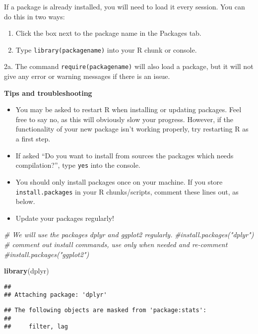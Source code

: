\documentclass[]{article}
\newenvironment{Shaded}{\begin{snugshade}}{\end{snugshade}}
\newcommand{\KeywordTok}[1]{\textcolor[rgb]{0.13,0.29,0.53}{\textbf{#1}}}
\newcommand{\CommentTok}[1]{\textcolor[rgb]{0.56,0.35,0.01}{\textit{#1}}}
\newcommand{\NormalTok}[1]{#1}
\begin{document}
If a package is already installed, you will need to load it every
session. You can do this in two ways:

\begin{enumerate}
\def\labelenumi{\arabic{enumi}.}
\item
  Click the box next to the package name in the Packages tab.
\item
  Type \texttt{library(packagename)} into your R chunk or console.
\end{enumerate}

2a. The command \texttt{require(packagename)} will also load a package,
but it will not give any error or warning messages if there is an issue.

\textbf{Tips and troubleshooting}

\begin{itemize}
\item
  You may be asked to restart R when installing or updating packages.
  Feel free to say no, as this will obviously slow your progress.
  However, if the functionality of your new package isn't working
  properly, try restarting R as a first step.
\item
  If asked ``Do you want to install from sources the packages which
  needs compilation?'', type \texttt{yes} into the console.
\item
  You should only install packages once on your machine. If you store
  \texttt{install.packages} in your R chunks/scripts, comment these
  lines out, as below.
\item
  Update your packages regularly!
\end{itemize}

\begin{Shaded}
\begin{Highlighting}[]
\CommentTok{# We will use the packages dplyr and ggplot2 regularly. }
\CommentTok{#install.packages("dplyr") # comment out install commands, use only when needed and re-comment}
\CommentTok{#install.packages("ggplot2")}

\KeywordTok{library}\NormalTok{(dplyr)}
\end{Highlighting}
\end{Shaded}

\begin{verbatim}
## 
## Attaching package: 'dplyr'
\end{verbatim}

\begin{verbatim}
## The following objects are masked from 'package:stats':
## 
##     filter, lag
\end{verbatim}
\end{document}
